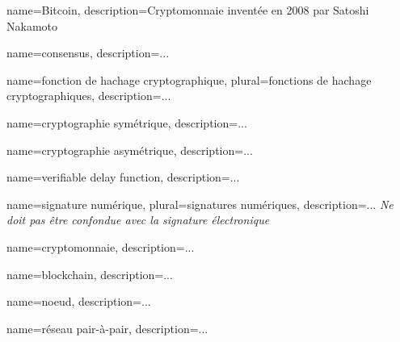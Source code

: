 {
    name=Bitcoin,
    description={Cryptomonnaie inventée en 2008 par Satoshi Nakamoto}
}

{
    name=consensus,
    description={...}
}

{
    name=fonction de hachage cryptographique,
    plural=fonctions de hachage cryptographiques,
    description={...}
}

{
    name=cryptographie symétrique,
    description={...}
}

{
    name=cryptographie asymétrique,
    description={...}
}

{
    name=verifiable delay function,
    description={...}
}

{
    name=signature numérique,
    plural=signatures numériques,
    description={... \textit{Ne doit pas être confondue avec la signature électronique}}
}

{
    name=cryptomonnaie,
    description={...}
}

{
    name=blockchain,
    description={...}
}

{
    name=noeud,
    description={...}
}

{
    name=réseau pair-à-pair,
    description={...}
}

